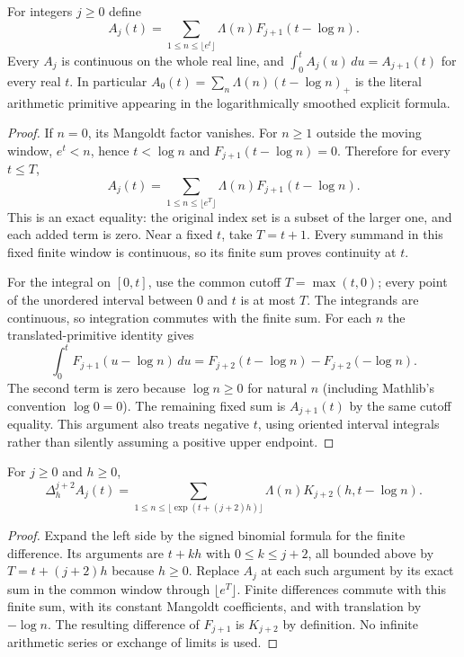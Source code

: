 \begin{definition}
\label{kernel:mangoldt-primitives}
\leanok
For integers $j\geq0$ define
\[
 A_j(t)=\sum_{1\leq n\leq\lfloor e^t\rfloor}
        \Lambda(n)F_{j+1}(t-\log n).
\]
Every $A_j$ is continuous on the whole real line, and
$\int_0^t A_j(u)\,du=A_{j+1}(t)$ for every real $t$.
In particular $A_0(t)=\sum_n\Lambda(n)(t-\log n)_+$ is the literal
arithmetic primitive appearing in the logarithmically smoothed explicit
formula.
\end{definition}
\begin{proof}
If $n=0$, its Mangoldt factor vanishes.  For $n\geq1$ outside the
moving window, $e^t<n$, hence $t<\log n$ and
$F_{j+1}(t-\log n)=0$.  Therefore for every $t\leq T$,
\[
 A_j(t)=\sum_{1\leq n\leq\lfloor e^T\rfloor}
          \Lambda(n)F_{j+1}(t-\log n).
\]
This is an exact equality: the original index set is a subset of the
larger one, and each added term is zero.  Near a fixed $t$, take
$T=t+1$.  Every summand in this fixed finite window is continuous, so
its finite sum proves continuity at $t$.

For the integral on $[0,t]$, use the common cutoff
$T=\max(t,0)$; every point of the unordered interval between $0$ and
$t$ is at most $T$.  The integrands are continuous, so integration
commutes with the finite sum.  For each $n$ the translated-primitive
identity gives
\[
 \int_0^t F_{j+1}(u-\log n)\,du
 =F_{j+2}(t-\log n)-F_{j+2}(-\log n).
\]
The second term is zero because $\log n\geq0$ for natural $n$
(including Mathlib's convention $\log0=0$).
The remaining fixed sum is $A_{j+1}(t)$ by the same cutoff equality.
This argument also treats negative $t$, using oriented interval
integrals rather than silently assuming a positive upper endpoint.
\end{proof}

\begin{lemma}
\label{kernel:mangoldt-detector}
\leanok
For $j\geq0$ and $h\geq0$,
\[
 \Delta_h^{j+2}A_j(t)=
 \sum_{1\leq n\leq\lfloor\exp(t+(j+2)h)\rfloor}
       \Lambda(n)K_{j+2}(h,t-\log n).
\]
\end{lemma}
\begin{proof}
Expand the left side by the signed binomial formula for the finite
difference.  Its arguments are $t+kh$ with $0\leq k\leq j+2$, all
bounded above by $T=t+(j+2)h$ because $h\geq0$.
Replace $A_j$ at each such argument by its exact sum in the common
window through $\lfloor e^T\rfloor$.
Finite differences commute with this finite sum, with its constant
Mangoldt coefficients, and with translation by $-\log n$.
The resulting difference of $F_{j+1}$ is $K_{j+2}$ by definition.
No infinite arithmetic series or exchange of limits is used.
\end{proof}

